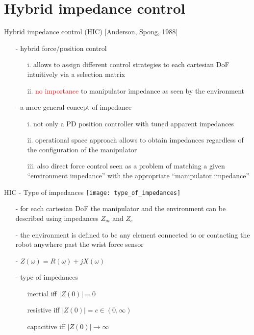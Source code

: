 \section{Hybrid impedance control}

\begin{frame}{Hybrid impedance control (HIC) [Anderson, Spong, 1988]}
  \begin{itemize}
  \item [-] hybrid force/position control
    \begin{itemize}
    \item[i.] allows to assign  \textcolor{dgreen}{different control strategies} to each cartesian DoF
      intuitively via a selection matrix
    \item[ii.] \textcolor{red}{no importance} to manipulator impedance as seen by the environment
    \end{itemize}
  \item [-] a more general concept of impedance
    \begin{itemize}
    \item[i.] not only a PD position controller with tuned apparent impedances
    \item[ii.] operational space approach allows to obtain impedances regardless 
      of the configuration of the manipulator
    \item[iii.] also direct force control seen as a problem of matching a given ``environment impedance''
      with the appropriate ``manipulator impedance''
    \end{itemize}
  \end{itemize}
\end{frame}

\begin{frame}{HIC - Type of impedances}
  \centering
  \texttt{[image: type\_of\_impedances]}
  \begin{itemize}
  \item[-] for each cartesian DoF the manipulator and the environment can be described using impedances $Z_m$ and $Z_e$
  \item[-] the environment is defined to be any element connected
    to or contacting the robot anywhere \alert{past the wrist} force sensor
  \item[-] $Z(\omega) = R(\omega) + j X(\omega)$
  \item[-] type of impedances
    \begin{itemize}
    \item[] inertial iff $|Z(0)| = 0$
    \item[] resistive iff $|Z(0)| = c \in (0, \infty)$
    \item[] capacitive iff $|Z(0)| \rightarrow \infty$
    \end{itemize}
  \end{itemize}
\end{frame}


